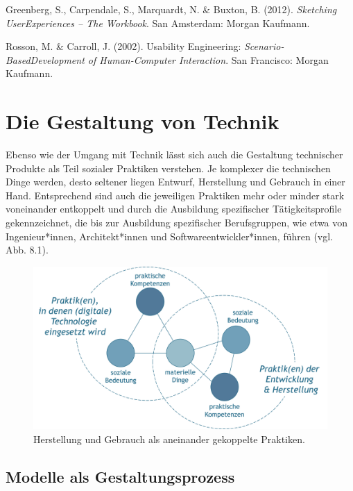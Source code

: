 \documentclass[
  a4paper,
]{book}
\begin{document}
Greenberg, S., Carpendale, S., Marquardt, N. \& Buxton, B. (2012). \emph{Sketching UserExperiences -- The Workbook}. San Amsterdam: Morgan Kaufmann.

Rosson, M. \& Carroll, J. (2002). Usability Engineering: \emph{Scenario-BasedDevelopment of Human-Computer Interaction}. San Francisco: Morgan Kaufmann.

\chapter{Die Gestaltung von Technik}\label{die-gestaltung-von-technik}

Ebenso wie der Umgang mit Technik lässt sich auch die Gestaltung technischer Produkte als Teil sozialer Praktiken verstehen. Je komplexer die technischen Dinge werden, desto seltener liegen Entwurf, Herstellung und Gebrauch in einer Hand. Entsprechend sind auch die jeweiligen Praktiken mehr oder minder stark voneinander entkoppelt und durch die Ausbildung spezifischer Tätigkeitsprofile gekennzeichnet, die bis zur Ausbildung spezifischer Berufsgruppen, wie etwa von Ingenieur*innen, Architekt*innen und Softwareentwickler*innen, führen (vgl. {Abb. 8.1}).

\begin{figure}

{\centering \includegraphics{Figures/08-01-gekoppelte-Praktiken} 

}

\caption{Herstellung und Gebrauch als aneinander gekoppelte Praktiken.}\label{fig:fig8}
\end{figure}

\section{Modelle als Gestaltungsprozess}\label{modelle-als-gestaltungsprozess}
\end{document}
